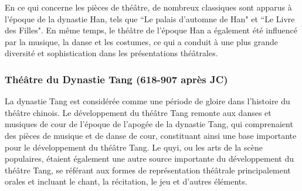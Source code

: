 \documentclass[UTF8,a4paper,12pt]{ctexart}
\numberwithin{equation}{section}
\newcommand{\mycite}[1]{\cite{#1}}
\begin{document}
En ce qui concerne les pièces de théâtre, de nombreux classiques sont apparus à l'époque de la dynastie Han, tels que ``Le palais d'automne de Han" et ``Le Livre des Filles". En même temps, le théâtre de l'époque Han a également été influencé par la musique, la danse et les costumes, ce qui a conduit à une plus grande diversité et sophistication dans les présentations théâtrales.

\subsubsection{Théâtre du Dynastie Tang (618-907 après JC)}
La dynastie Tang est considérée comme une période de gloire dans l'histoire du théâtre chinois. Le développement du théâtre Tang remonte aux danses et musiques de cour de l'époque de l'apogée de la dynastie Tang, qui comprenaient des pièces de musique et de danse de cour, constituant ainsi une base importante pour le développement du théâtre Tang. Le quyi, ou les arts de la scène populaires, étaient également une autre source importante du développement du théâtre Tang, se référant aux formes de représentation théâtrale principalement orales et incluant le chant, la récitation, le jeu et d'autres éléments\mycite{14}.
\end{document}
